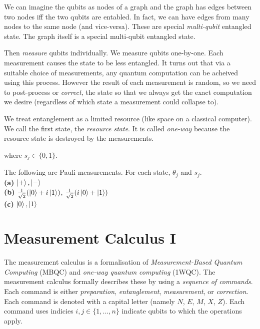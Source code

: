 We can imagine the qubits as nodes of a graph and the graph has edges between 
two nodes iff the two qubits are entabled. 
In fact, we can have edges from many nodes to the same node (and vice-versa).
These are special \textit{multi-qubit} entangled state. 
The graph itself is a special multi-qubit entangled state. 


Then \textit{measure} qubits individually. We measure qubits one-by-one. 
Each measurement causes the state to be less entangled. 
It turns out that via a suitable choice of measurements, any 
quantum computation can be acheived using this process. 
However the result of each measurement is random, so we need to post-process or \textit{correct}, 
the state so that we always get the exact computation we desire (regardless of which state 
a measurement could collapse to). 


We treat entanglement as a limited resource (like space on a classical computer). 
We call the first state, the \textit{resource state}. 
It is called \textit{one-way} because the resource state 
is destroyed by the measurements.
 

\frmrule 

where $s_j \in \{0,1\}$.

\frmrule 

\begin{example}
The following are Pauli measurements. For each state, $\theta_j$ and $s_j$. \\
\textbf{(a)} $\left|+\right\rangle, \left|-\right\rangle$\\
\textbf{(b)} $\frac{1}{\sqrt{2}}(\left|0\right\rangle + i\left|1\right\rangle)$, $\frac{1}{\sqrt{2}}(i\left|0\right\rangle + \left|1\right\rangle)$ \\
\textbf{(c)} $\left|0\right\rangle, \left|1\right\rangle$\\
\end{example}

\frmrule 



\section{Measurement Calculus I}


The measurement calculus is a formalisation of \textit{Measurement-Based Quantum Computing} (MBQC)
and \textit{one-way quantum computing} (1WQC). 
The measurement calculus formally describes these by using a \textit{sequence of commands}. 
Each command is either \textit{preparation}, \textit{entanglement}, \textit{measurement}, or 
\textit{correction}. Each command is denoted with a capital letter (namely $N$, $E$, $M$, $X$, $Z$).
Each command uses indicies $i,j \in \{1,...,n\}$ indicate qubits to which the operations apply.  

